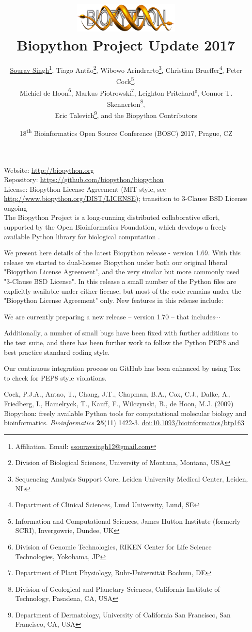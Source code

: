 \documentclass[10pt,oneside]{article}
\title{%
\vspace{-1.5in}
\includegraphics[width=0.4\textwidth]{biopython.jpg}\\
\vspace{3mm}Biopython Project Update 2017}
\author{
	\underline{Sourav Singh}\thanks{Affiliation. Email: \href{mailto:ssouravsingh12@gmail.com}{ssouravsingh12@gmail.com}},
    Tiago Ant\~{a}o\thanks{Division of Biological Sciences, University of Montana, Montana, USA},
    Wibowo Arindrarto\thanks{Sequencing Analysis Support Core, Leiden University Medical Center, Leiden, NL},
    Christian Brueffer\thanks{Department of Clinical Sciences, Lund University, Lund, SE},
    Peter Cock\thanks{Information and Computational Sciences, James Hutton Institute (formerly SCRI), Invergowrie, Dundee, UK},\\
    Michiel de Hoon\thanks{Division of Genomic Technologies, RIKEN Center for Life Science Technologies, Yokohama, JP},
    Markus Piotrowski\thanks{Department of Plant Physiology, Ruhr-Universität Bochum, DE},
    Leighton Pritchard\textsuperscript{e},  %
    Connor T. Skennerton\thanks{Division of Geological and Planetary Sciences, California Institute of Technology, Pasadena, CA, USA},\\
    Eric Talevich\thanks{Department of Dermatology, University of California San Francisco, San Francisco, CA, USA},
    and the Biopython Contributors}
\date{18\textsuperscript{th} Bioinformatics Open Source Conference (BOSC) 2017, Prague, CZ}
\begin{document}
\maketitle
\thispagestyle{empty}

\vspace{-0.2in}
\noindent
Website: \url{http://biopython.org} \\
Repository: \url{https://github.com/biopython/biopython} \\
License: Biopython License Agreement (MIT style, see \url{http://www.biopython.org/DIST/LICENSE}); transition to 3-Clause BSD License ongoing\\

The Biopython Project is a long-running distributed collaborative effort,
supported by the Open Bioinformatics Foundation, which develops a freely
available Python library for biological computation \cite{AppNote}.

We present here details of the latest Biopython release - version 1.69.  With this
release we started to dual-license Biopython under both our original liberal
"Biopython License Agreement", and the very similar but more commonly used
"3-Clause BSD License".  In this release a small number of the Python files
are explicitly available under either license, but most of the code remains
under the "Biopython License Agreement" only.  New features in this release
include:

We are currently preparing a new release -- version 1.70 -- that includes$\cdots$

Additionally, a number of small bugs have been fixed with further additions
to the test suite, and there has been further work to follow the Python PEP8
and best practice standard coding style.

Our continuous integration process on GitHub has been enhanced by
using Tox to check for PEP8 style violations.


\begin{thebibliography}{}

Cock, P.J.A., Antao, T., Chang, J.T., Chapman, B.A., Cox, C.J., Dalke, A., Friedberg, I., Hamelryck, T., Kauff, F., Wilczynski, B., de Hoon, M.J. (2009) Biopython: freely available Python tools for computational molecular biology and bioinformatics. {\it Bioinformatics} {\bf 25}(11) 1422-3. \href{http://dx.doi.org/10.1093/bioinformatics/btp163}{doi:10.1093/bioinformatics/btp163}

\end{thebibliography}
\end{document}
